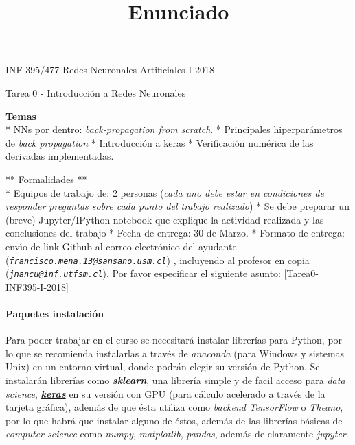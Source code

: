 \documentclass[11pt]{article}
\title{Enunciado}
\begin{document}
    
    
    \maketitle
    
    

    
    INF-395/477 Redes Neuronales Artificiales I-2018

Tarea 0 - Introducción a Redes Neuronales

\textbf{Temas}\\
* NNs por dentro: \emph{back-propagation from scratch}. * Principales
hiperparámetros de \emph{back propagation} * Introducción a keras *
Verificación numérica de las derivadas implementadas.

** Formalidades **\\
* Equipos de trabajo de: 2 personas (\emph{cada uno debe estar en
condiciones de responder preguntas sobre cada punto del trabajo
realizado}) * Se debe preparar un (breve) Jupyter/IPython notebook que
explique la actividad realizada y las conclusiones del trabajo * Fecha
de entrega: 30 de Marzo. * Formato de entrega: envı́o de link Github al
correo electrónico del ayudante
(\emph{\href{mailto:francisco.mena.13@sansano.usm.cl}{\nolinkurl{francisco.mena.13@sansano.usm.cl}}})
, incluyendo al profesor en copia
(\emph{\href{mailto:jnancu@inf.utfsm.cl}{\nolinkurl{jnancu@inf.utfsm.cl}}}).
Por favor especificar el siguiente asunto: {[}Tarea0-INF395-I-2018{]}

\paragraph{Paquetes instalación}\label{paquetes-instalaciuxf3n}

Para poder trabajar en el curso se necesitará instalar librerías para
Python, por lo que se recomienda instalarlas a través de \emph{anaconda}
(para Windows y sistemas Unix) en un entorno virtual, donde podrán
elegir su versión de Python. Se instalarán librerías como
\textbf{\href{http://scikit-learn.org/stable/}{\emph{sklearn}}}, una
librería simple y de facil acceso para \emph{data science},
\textbf{\href{https://keras.io/}{\emph{keras}}} en su versión con GPU
(para cálculo acelerado a través de la tarjeta gráfica), además de que
ésta utiliza como \emph{backend} \emph{TensorFlow} o \emph{Theano}, por
lo que habrá que instalar alguno de éstos, además de las librerías
básicas de \emph{computer science} como \emph{numpy}, \emph{matplotlib},
\emph{pandas}, además de claramente \emph{jupyter}.
\end{document}
